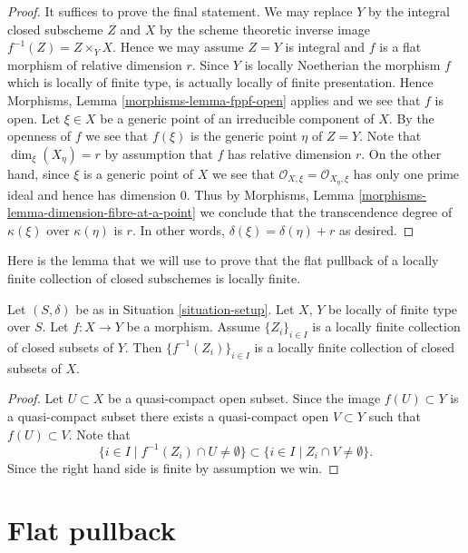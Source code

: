 \begin{proof}
It suffices to prove the final statement.
We may replace $Y$ by the integral closed subscheme $Z$ and
$X$ by the scheme theoretic inverse image $f^{-1}(Z) = Z \times_Y X$.
Hence we may assume $Z = Y$ is integral and $f$ is a flat morphism
of relative dimension $r$. Since $Y$ is locally Noetherian the
morphism $f$ which is locally of finite type,
is actually locally of finite presentation. Hence
Morphisms, Lemma \ref{morphisms-lemma-fppf-open}
applies and we see that $f$ is open.
Let $\xi \in X$ be a generic point of an irreducible component
of $X$. By the openness of $f$ we see that $f(\xi)$ is the
generic point $\eta$ of $Z = Y$. Note that $\dim_\xi(X_\eta) = r$
by assumption that $f$ has relative dimension $r$. On the other
hand, since $\xi$ is a generic point of $X$ we see that
$\mathcal{O}_{X, \xi} = \mathcal{O}_{X_\eta, \xi}$ has only one
prime ideal and hence has dimension $0$. Thus by
Morphisms, Lemma \ref{morphisms-lemma-dimension-fibre-at-a-point}
we conclude that the transcendence
degree of $\kappa(\xi)$ over $\kappa(\eta)$ is $r$.
In other words, $\delta(\xi) = \delta(\eta) + r$ as desired.
\end{proof}

\noindent
Here is the lemma that we will use to prove that the flat pullback
of a locally finite collection of closed subschemes is locally finite.

\begin{lemma}
\label{lemma-inverse-image-locally-finite}
Let $(S, \delta)$ be as in Situation \ref{situation-setup}.
Let $X$, $Y$ be locally of finite type over $S$.
Let $f : X \to Y$ be a morphism.
Assume $\{Z_i\}_{i \in I}$ is a locally
finite collection of closed subsets of $Y$.
Then $\{f^{-1}(Z_i)\}_{i \in I}$ is a locally finite
collection of closed subsets of $X$.
\end{lemma}

\begin{proof}
Let $U \subset X$ be a quasi-compact open subset.
Since the image $f(U) \subset Y$ is a quasi-compact subset
there exists a quasi-compact open $V \subset Y$ such that
$f(U) \subset V$. Note that
$$
\{i \in I \mid f^{-1}(Z_i) \cap U \not = \emptyset \}
\subset
\{i \in I \mid Z_i \cap V \not = \emptyset \}.
$$
Since the right hand side is finite by assumption we win.
\end{proof}



\section{Flat pullback}
\label{section-flat-pullback}


